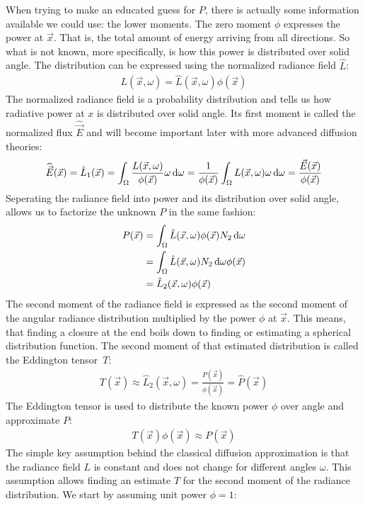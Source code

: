 When trying to make an educated guess for $P$, there is actually some information available we could use: the lower moments. The zero moment $\phi$ expresses the power at $\vec{x}$. That is, the total amount of energy arriving from all directions. So what is not known, more specifically, is how this power is distributed over solid angle. The distribution can be expressed using the normalized radiance field $\hat{L}$:
\begin{align*}
L(\vec{x}, \omega) = \hat{L}(\vec{x}, \omega)\phi(\vec{x})
\end{align*}
The normalized radiance field is a probability distribution and tells us how radiative power at $x$ is distributed over solid angle. Its first moment is called the normalized flux $\widehat{\vec{E}}$ and will become important later with more advanced diffusion theories:
\begin{align*}
\widehat{\vec{E}}(\vec{x}) = \hat{L}_1(\vec{x}) = \int_{\Omega}\frac{L(\vec{x}, \omega)}{\phi(\vec{x})}\omega\,\mathrm{d}\omega = \frac{1}{\phi(\vec{x})}\int_{\Omega}L(\vec{x}, \omega)\omega\,\mathrm{d}\omega = \frac{\vec{E}(\vec{x})}{\phi(\vec{x})}
\end{align*}
Seperating the radiance field into power and its distribution over solid angle, allows us to factorize the unknown $P$ in the same fashion:
\begin{align*}
P(\vec{x}) &=
\int_{\Omega}{\hat{L}(\vec{x}, \omega)\phi(\vec{x})N_2\,\mathrm{d}\omega}\\
&= \int_{\Omega}{\hat{L}(\vec{x}, \omega)N_2\,\mathrm{d}\omega}\phi(\vec{x})\\
&= \hat{L}_2(\vec{x}, \omega)\phi(\vec{x})
\end{align*}
The second moment of the radiance field is expressed as the second moment of the angular radiance distribution multiplied by the power $\phi$ at $\vec{x}$. This means, that finding a closure at the end boils down to finding or estimating a spherical distribution function. The second moment of that estimated distribution is called the Eddington tensor~$T$:
\begin{align*}
T(\vec{x}) \approx \hat{L}_2(\vec{x}, \omega) =
\frac{P(\vec{x})}{\phi(\vec{x})} =
\widehat{P}(\vec{x})
\end{align*}
The Eddington tensor is used to distribute the known power $\phi$ over angle and approximate $P$:
\begin{align*}
T(\vec{x})\phi(\vec{x}) \approx 
P(\vec{x})
\end{align*}
The simple key assumption behind the classical diffusion approximation is that the radiance field $L$ is constant and does not change for different angles $\omega$. This assumption allows finding an estimate $T$ for the second moment of the radiance distribution. We start by assuming unit power $\phi = 1$:
